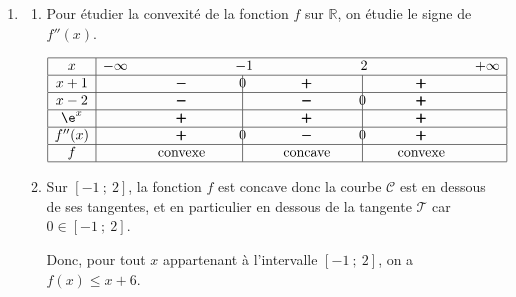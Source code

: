 \begin{enumerate}[resume]
\item 
	\begin{enumerate}
		\item Pour étudier la convexité de la fonction $f$ sur $\mathbb{R}$, on étudie le signe de $f''(x)$.
		
\begin{center}
{
\renewcommand{\arraystretch}{1.5}
\def\esp{\hspace*{2cm}}
$\begin{array}{|c | *{7}{c} |} 
\hline
x  & -\infty & \esp & -1 & \esp & 2 & \esp & +\infty \\
\hline
x+1 &  & \pmb{-} &  \vline\hspace{-2.7pt}{0} & \pmb{+} & \vline\hspace{-2.7pt}{\phantom 0} & \pmb{+} &\\
\hline
x-2 &  & \pmb{-} &  \vline\hspace{-2.7pt}{\phantom 0} & \pmb{-} & \vline\hspace{-2.7pt}{0} & \pmb{+} &\\
\hline
\e^x &  & \pmb{+} &  \vline\hspace{-2.7pt}{\phantom 0} & \pmb{+} & \vline\hspace{-2.7pt}{\phantom 0} & \pmb{+} &\\
\hline
f''(x) &  & \pmb{+} &  \vline\hspace{-2.7pt}{0} & \pmb{-} & \vline\hspace{-2.7pt}{0} & \pmb{+} & \\
\hline
f &  & \text{convexe} &  \vline\hspace{-2.7pt}{\phantom 0} & \text{concave} & \vline\hspace{-2.7pt}{\phantom 0} & \text{convexe} & \\
\hline
\end{array}$
}
\end{center}
		
		\item %
Sur $[-1~;~2]$, la fonction $f$ est concave donc la courbe $\mathcal{C}$ est en dessous de ses tangentes, et en particulier en dessous de la tangente $\mathcal{T}$ car $0\in [-1~;~2]$.		
		
Donc, pour tout $x$ appartenant à l'intervalle $[-1~;~2]$, on a $f(x) \leqslant x + 6$.		
	\end{enumerate}
\end{enumerate}

\bigskip

